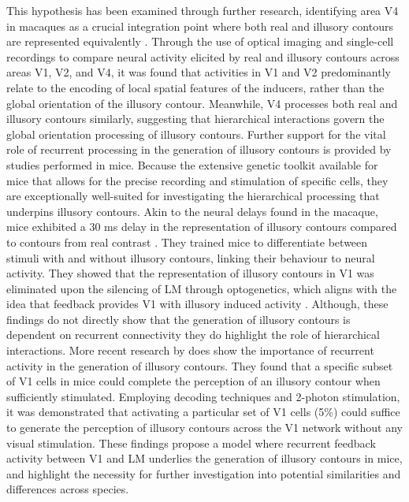 \documentclass[12pt]{article}
\begin{document}
This hypothesis has been examined through further research, identifying area V4 in macaques as a crucial integration point where both real and illusory contours are represented equivalently \autocite{panEquivalentRepresentationReal2012}. Through the use of optical imaging and single-cell recordings to compare neural activity elicited by real and illusory contours across areas V1, V2, and V4, it was found that activities in V1 and V2 predominantly relate to the encoding of local spatial features of the inducers, rather than the global orientation of the illusory contour. Meanwhile, V4 processes both real and illusory contours similarly, suggesting that hierarchical interactions govern the global orientation processing of illusory contours. Further support for the vital role of recurrent processing in the generation of illusory contours is provided by studies performed in mice. Because the extensive genetic toolkit available for mice that allows for the precise recording and stimulation of specific cells, they are exceptionally well-suited for investigating the hierarchical processing that underpins illusory contours. Akin to the neural delays found in the macaque, mice exhibited a 30 ms delay in the representation of illusory contours compared to contours from real contrast \autocite{pakTopDownFeedbackControls2020}. They trained mice to differentiate between stimuli with and without illusory contours, linking their behaviour to neural activity. They showed that the representation of illusory contours in V1 was eliminated upon the silencing of LM through optogenetics, which aligns with the idea that feedback provides V1 with illusory induced activity \autocite{wyatteEarlyRecurrentFeedback2014}. Although, these findings do not directly show that the generation of illusory contours is dependent on recurrent connectivity they do highlight the role of hierarchical interactions. More recent research by \textcite{shinRecurrentPatternCompletion2023} does show the importance of recurrent activity in the generation of illusory contours. They found that a specific subset of V1 cells in mice could complete the perception of an illusory contour when sufficiently stimulated. Employing decoding techniques and 2-photon stimulation, it was demonstrated that activating a particular set of V1 cells (5\%) could suffice to generate the perception of illusory contours across the V1 network without any visual stimulation. These findings propose a model where recurrent feedback activity between V1 and LM underlies the generation of illusory contours in mice, and highlight the necessity for further investigation into potential similarities and differences across species.
\end{document}
